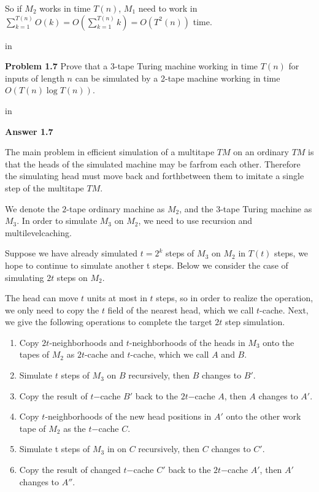 \documentclass[11pt]{article}
\begin{document}
So if $M_2$ works in time $T(n)$, $M_1$ need to work in $\sum_{k=1}^{T(n)}O(k)=O(\sum_{k=1}^{T(n)}k)=O(T^2(n))$ time.
	
 in

\newpage
{\bf Problem 1.7} Prove that a 3-tape Turing machine working in time $T(n)$ for inputs of length $n$ can be simulated by a 2-tape machine working in time $O(T(n) \log T(n))$.

 in


{\bf Answer 1.7 }

The main problem in efficient simulation of a multitape $TM$ on an ordinary $TM$ is that the heads of the simulated machine may be farfrom each other. Therefore the simulating head must move back and forthbetween them to imitate a single step of the multitape $TM$.

We denote the $2$-tape ordinary machine as $M_2$, and the $3$-tape Turing machine as $M_3$. In order to simulate $M_3$ on $M_2$, we need to use recursion and multilevelcaching.

Suppose we have already simulated $t = 2^k$ steps of $M_3$ on $M_2$ in $T(t)$ steps, we hope to continue to simulate another t steps. Below we consider the case of simulating $2t$ steps on $M_2$.

The head can move $t$ units at most in $t$ steps, so in order to realize the operation, we only need to copy the $t$ field of the nearest head, which we call $t$-cache. Next, we give the following operations to complete the target $2t$ step simulation.

\begin{enumerate}
	\item Copy $2t$-neighborhoods and $t$-neighborhoods of the heads in $M_3$ onto the tapes of $M_2$ as $2t$-cache and $t$-cache, which we call $A$ and $B$.
	\item Simulate $t$ steps of $M_3$ on $B$ recursively, then $B$ changes to $B'$. 
	\item Copy the result of $t$−cache $B'$ back to the $2t$−cache $A$, then $A$ changes to $A'$.
	\item Copy $t$-neighborhoods of the new head positions in $A'$ onto the other work tape of $M_2$ as the $t$−cache $C$.
	\item Simulate t steps of $M_3$ in on $C$ recursively, then $C$ changes to $C'$. 
	\item Copy the result of changed $t$−cache $C'$ back to the $2t$−cache $A'$, then $A'$ changes to $A''$.
\end{enumerate}
\end{document}
